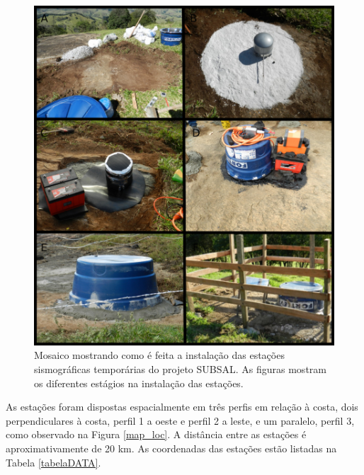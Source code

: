 \begin{figure}[!ht]
\centering
\includegraphics[scale=0.5]{Figs/instalacao.png}
\caption[Mosaico mostrando como é feita a instalação das estações sismográficas temporárias do projeto SUBSAL.]{Mosaico mostrando como é feita a instalação das estações sismográficas temporárias do projeto SUBSAL. As figuras mostram os diferentes estágios na instalação das estações.}
\label{instalacao}
\end{figure} 

As estações foram dispostas espacialmente em três perfis em relação à costa, dois perpendiculares à costa, perfil 1 a oeste e perfil 2 a leste, e um paralelo, perfil 3, como observado na Figura \ref{map_loc}. A distância entre as estações é aproximativamente de 20 km. As coordenadas das estações estão listadas na Tabela \ref{tabelaDATA}. 

